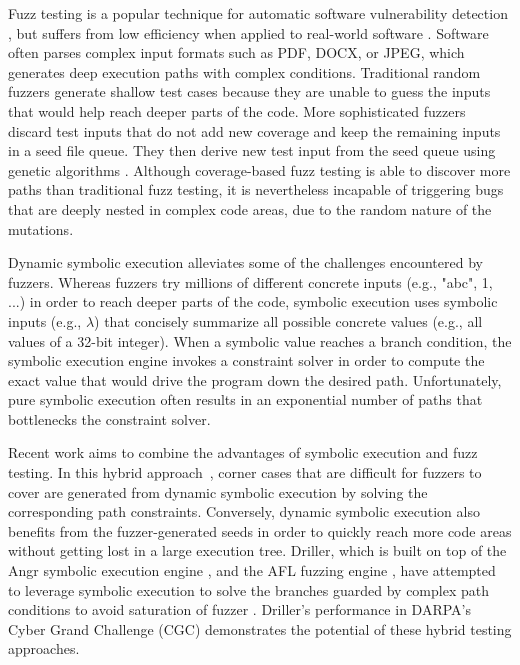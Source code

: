 Fuzz testing is a popular technique for automatic software
vulnerability detection \cite{Miller:Fuzz, 5010257, sutton2007fuzzing},
but suffers from low efficiency when applied to real-world software
\cite{neystadt2008automated, godefroid2008automating, ganesh2009taint,
cadar2011symbolic, rawat2017vuzzer, stephens2016driller}. Software
often parses complex input formats such as PDF, DOCX, or JPEG, which
generates deep execution paths with complex conditions. Traditional
random fuzzers generate shallow test cases because they are unable to
guess the inputs that would help reach deeper parts of the code. More
sophisticated fuzzers discard test inputs that do not add new coverage
and keep the remaining inputs in a seed file queue. They then derive
new test input from the seed queue using genetic algorithms
\cite{rawat2017vuzzer, online:afl, stephens2016driller}. Although
coverage-based fuzz testing is able to discover more paths than
traditional fuzz testing, it is nevertheless incapable of triggering
bugs that are deeply nested in complex code areas, due to the random
nature of the mutations.

Dynamic symbolic execution alleviates some of the challenges
encountered by fuzzers. Whereas fuzzers try millions of different
concrete inputs (e.g., "abc", 1, ...) in order to reach deeper parts of
the code, symbolic execution uses symbolic inputs (e.g., $\lambda$)
that concisely summarize all possible concrete values (e.g., all values
of a 32-bit integer). When a symbolic value reaches a branch condition,
the symbolic execution engine invokes a constraint solver in order to
compute the exact value that would drive the program down the desired
path. Unfortunately, pure symbolic execution often results in an
exponential number of paths that bottlenecks the constraint solver.

Recent work aims to combine the advantages of symbolic execution and
fuzz testing. In this hybrid approach~\cite{godefroid2012sage,
yeh2015craxfuzz, majumdar2007hybrid, pak2012hybrid}, corner cases that
are difficult for fuzzers to cover are generated from dynamic symbolic
execution by solving the corresponding path constraints. Conversely,
dynamic symbolic execution also benefits from the fuzzer-generated
seeds in order to quickly reach more code areas without getting lost in
a large execution tree. Driller, which is built on top of the Angr
symbolic execution engine \cite{Shoshitaishvili_firmalice-automatic},
and the AFL fuzzing engine \cite{online:afl}, have attempted to
leverage symbolic execution to solve the branches guarded by complex
path conditions to avoid saturation of fuzzer
\cite{stephens2016driller}. Driller's performance in DARPA's Cyber
Grand Challenge (CGC) \cite{online:CGC} demonstrates the potential of
these hybrid testing approaches.

